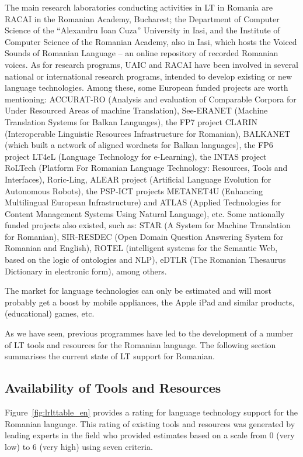 \begin{multicols}{2}
The main research laboratories conducting activities in LT in Romania are RACAI in the Romanian Academy, Bucharest; the Department of Computer Science of the “Alexandru Ioan Cuza” University in Iasi, and the Institute of Computer Science of the Romanian Academy, also in Iasi, which hosts the Voiced Sounds of Romanian Language – an online repository of recorded Romanian voices. As for research programs, UAIC and RACAI have been involved in several national or international research programs, intended to develop existing or new language technologies. Among these, some European funded projects are worth mentioning: ACCURAT-RO (Analysis and evaluation of Comparable Corpora for Under Resourced Areas of machine Translation), See-ERANET (Machine Translation Systems for Balkan Languages), the FP7 project CLARIN (Interoperable Linguistic Resources Infrastructure for Romanian), BALKANET (which built a network of aligned wordnets for Balkan languages), the FP6 project LT4eL (Language Technology for e-Learning), the INTAS project RoLTech (Platform For Romanian Language Technology: Resources, Tools and Interfaces), Roric-Ling, ALEAR project (Artificial Language Evolution for Autonomous Robots), the PSP-ICT projects METANET4U (Enhancing Multilingual European Infrastructure) and ATLAS (Applied Technologies for Content Management Systems Using Natural Language), etc. Some nationally funded projects also existed, such as: STAR (A System for Machine Translation for Romanian), SIR-RESDEC (Open Domain Question Answering System for Romanian and English), ROTEL (intelligent systems for the Semantic Web, based on the logic of ontologies and NLP), eDTLR (The Romanian Thesaurus Dictionary in electronic form), among others.

The market for language technologies can only be estimated and will most probably get a boost by mobile appliances, the Apple iPad and similar products, (educational) games, etc. 

As we have seen, previous programmes have led to the development of a number of LT tools and resources for the Romanian language. The following section summarises the current state of LT support for Romanian.
  
\subsection{Availability of Tools and Resources}

Figure~\ref{fig:lrlttable_en} provides a rating for language technology support for the Romanian language. This rating of existing tools and resources was generated by leading experts in the field who provided estimates based on a scale from 0 (very low) to 6 (very high) using seven criteria.


\end{multicols}
